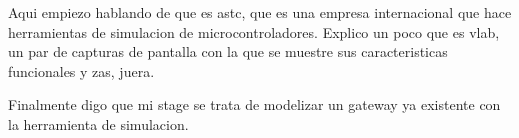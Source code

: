 Aqui empiezo hablando de que es astc, que es una empresa internacional que hace herramientas de simulacion de microcontroladores. Explico un poco que es vlab, un par de capturas de pantalla con la que se muestre sus caracteristicas funcionales y zas, juera. 

Finalmente digo que mi stage se trata de modelizar un gateway ya existente con la herramienta de simulacion.
